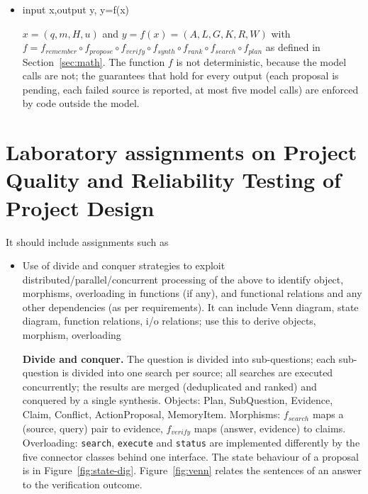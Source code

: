 \documentclass[oneside,a4paper,12pt]{report}
\begin{document}
\begin{appendices}
\begin{itemize}
\textbf{Retrieval policy.} Choosing which tool to call, with which query and at what granularity, over several turns, is a sequential decision problem under uncertainty; GRASP~\cite{grasp2026} learns such a policy with reinforcement learning. Cortex replaces the policy by a fixed plan of at most five sub-questions and one bounded retry, so the number of steps is constant.

\textbf{Complexity of one run.} With $|C|$ sources, $p \le 5$ sub-questions, $N$ evidence items, $|A|$ answer tokens and a constant number of model calls (at most 5), the run takes $O(p\,|C| + N \log N + |L| \cdot (|c| + |E_c|))$ work besides the model and tool calls, i.e. polynomial time. The problem as implemented is therefore in class P, with model and tool calls treated as bounded oracle calls.

\item input x,output y, y=f(x)

$x = (q, m, H, u)$ and $y = f(x) = (A, L, G, K, R, W)$ with
$f = f_{\mathit{remember}} \circ f_{\mathit{propose}} \circ f_{\mathit{verify}} \circ f_{\mathit{synth}} \circ f_{\mathit{rank}} \circ f_{\mathit{search}} \circ f_{\mathit{plan}}$ as defined in Section~\ref{sec:math}. The function $f$ is not deterministic, because the model calls are not; the guarantees that hold for every output (each proposal is pending, each failed source is reported, at most five model calls) are enforced by code outside the model.
\end{itemize}

\chapter{Laboratory assignments on Project Quality and Reliability Testing of Project Design}
\label{app:quality}

It should include assignments such as
\begin{itemize}
\item Use of divide and conquer strategies to exploit distributed/\allowbreak{}parallel/\allowbreak{}concurrent processing of the above to identify object, morphisms, overloading in functions (if any), and functional relations and any other dependencies (as per requirements).
             It can include Venn diagram, state diagram, function relations, i/o relations; use this to derive objects, morphism, overloading

\textbf{Divide and conquer.} The question is divided into sub-questions; each sub-question is divided into one search per source; all searches are executed concurrently; the results are merged (deduplicated and ranked) and conquered by a single synthesis. Objects: Plan, SubQuestion, Evidence, Claim, Conflict, ActionProposal, MemoryItem. Morphisms: $f_{\mathit{search}}$ maps a (source, query) pair to evidence, $f_{\mathit{verify}}$ maps (answer, evidence) to claims. Overloading: \texttt{search}, \texttt{execute} and \texttt{status} are implemented differently by the five connector classes behind one interface. The state behaviour of a proposal is in Figure~\ref{fig:state-dig}. Figure~\ref{fig:venn} relates the sentences of an answer to the verification outcome.


\end{itemize}
\end{appendices}
\end{document}
